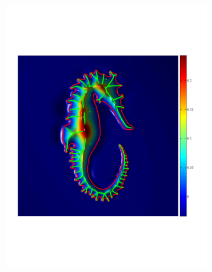 \documentclass[annual]{acmsiggraph}
\begin{document}
\begin{figure}
\begin{subfigure}[b]{0.34\linewidth}
                \includegraphics[width=\textwidth]{images/seahorse/2.pdf}
        \end{subfigure}
~
		\begin{subfigure}[b]{0.25\linewidth}
                \centering

\end{subfigure}
\end{figure}
\end{document}
